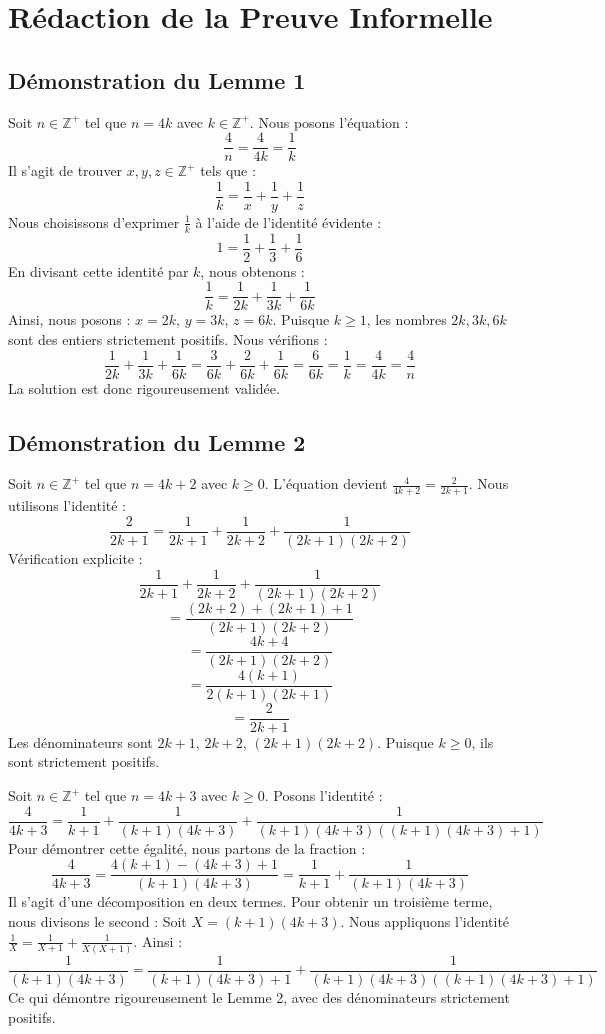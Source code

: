 \documentclass[11pt,a4paper]{article}
\begin{document}
\section{Rédaction de la Preuve Informelle}

\subsection{Démonstration du Lemme 1}
Soit $n \in \mathbb{Z}^{+}$ tel que $n = 4k$ avec $k \in \mathbb{Z}^{+}$.
Nous posons l'équation :
$$ \frac{4}{n} = \frac{4}{4k} = \frac{1}{k} $$
Il s'agit de trouver $x, y, z \in \mathbb{Z}^{+}$ tels que :
$$ \frac{1}{k} = \frac{1}{x} + \frac{1}{y} + \frac{1}{z} $$
Nous choisissons d'exprimer $\frac{1}{k}$ à l'aide de l'identité évidente :
$$ 1 = \frac{1}{2} + \frac{1}{3} + \frac{1}{6} $$
En divisant cette identité par $k$, nous obtenons :
$$ \frac{1}{k} = \frac{1}{2k} + \frac{1}{3k} + \frac{1}{6k} $$
Ainsi, nous posons :
$x = 2k$, $y = 3k$, $z = 6k$.
Puisque $k \geq 1$, les nombres $2k, 3k, 6k$ sont des entiers strictement positifs.
Nous vérifions :
$$ \frac{1}{2k} + \frac{1}{3k} + \frac{1}{6k} = \frac{3}{6k} + \frac{2}{6k} + \frac{1}{6k} = \frac{6}{6k} = \frac{1}{k} = \frac{4}{4k} = \frac{4}{n} $$
La solution est donc rigoureusement validée.

\subsection{Démonstration du Lemme 2}
Soit $n \in \mathbb{Z}^{+}$ tel que $n = 4k+2$ avec $k \geq 0$.
L'équation devient $\frac{4}{4k+2} = \frac{2}{2k+1}$.
Nous utilisons l'identité :
$$ \frac{2}{2k+1} = \frac{1}{2k+1} + \frac{1}{2k+2} + \frac{1}{(2k+1)(2k+2)} $$
Vérification explicite :
$$ \frac{1}{2k+1} + \frac{1}{2k+2} + \frac{1}{(2k+1)(2k+2)} $$
$$ = \frac{(2k+2) + (2k+1) + 1}{(2k+1)(2k+2)} $$
$$ = \frac{4k+4}{(2k+1)(2k+2)} $$
$$ = \frac{4(k+1)}{2(k+1)(2k+1)} $$
$$ = \frac{2}{2k+1} $$
Les dénominateurs sont $2k+1$, $2k+2$, $(2k+1)(2k+2)$. Puisque $k \geq 0$, ils sont strictement positifs.

Soit $n \in \mathbb{Z}^{+}$ tel que $n = 4k+3$ avec $k \geq 0$.
Posons l'identité :
$$ \frac{4}{4k+3} = \frac{1}{k+1} + \frac{1}{(k+1)(4k+3)} + \frac{1}{(k+1)(4k+3)((k+1)(4k+3)+1)} $$
Pour démontrer cette égalité, nous partons de la fraction :
$$ \frac{4}{4k+3} = \frac{4(k+1) - (4k+3) + 1}{(k+1)(4k+3)} = \frac{1}{k+1} + \frac{1}{(k+1)(4k+3)} $$
Il s'agit d'une décomposition en deux termes. Pour obtenir un troisième terme, nous divisons le second :
Soit $X = (k+1)(4k+3)$. Nous appliquons l'identité $\frac{1}{X} = \frac{1}{X+1} + \frac{1}{X(X+1)}$.
Ainsi :
$$ \frac{1}{(k+1)(4k+3)} = \frac{1}{(k+1)(4k+3)+1} + \frac{1}{(k+1)(4k+3)((k+1)(4k+3)+1)} $$
Ce qui démontre rigoureusement le Lemme 2, avec des dénominateurs strictement positifs.
\end{document}
